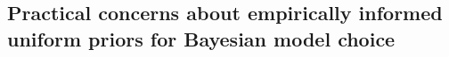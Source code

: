 \documentclass[letterpaper,12pt]{article}
\begin{document}
\begin{linenumbers}


\subsection*{Practical concerns about empirically informed uniform priors for
    Bayesian model choice}


\end{linenumbers}
\end{document}
